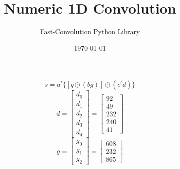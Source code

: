 \documentclass{article}%
\title{Numeric 1D Convolution}%
\author{Fast{-}Convolution Python Library}%
\date{\today}%
\begin{document}
%
\normalsize%
\maketitle%
\[%
s = a^t \{[q \odot (bg)] \odot (c^t d)\}%
\]%
\[%
d = \left[\begin{matrix}d_{0}\\d_{1}\\d_{2}\\d_{3}\\d_{4}\end{matrix}\right] = \left[\begin{matrix}92\\49\\232\\240\\41\end{matrix}\right]%
\]%
\[%
g = \left[\begin{matrix}g_{0}\\g_{1}\\g_{2}\end{matrix}\right] = \left[\begin{matrix}608\\232\\865\end{matrix}\right]%
\]%
\end{document}
